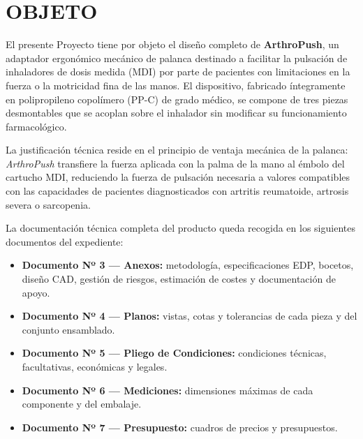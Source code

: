 \documentclass[11pt,a4paper]{article}
\begin{document}

\listoffigures

\newpage




\section{OBJETO}

El presente Proyecto tiene por objeto el diseño completo de \textbf{ArthroPush}, un adaptador ergonómico mecánico de palanca destinado a facilitar la pulsación de inhaladores de dosis medida (MDI) por parte de pacientes con limitaciones en la fuerza o la motricidad fina de las manos. El dispositivo, fabricado íntegramente en polipropileno copolímero (PP-C) de grado médico, se compone de tres piezas desmontables que se acoplan sobre el inhalador sin modificar su funcionamiento farmacológico.

La justificación técnica reside en el principio de ventaja mecánica de la palanca: \textit{ArthroPush} transfiere la fuerza aplicada con la palma de la mano al émbolo del cartucho MDI, reduciendo la fuerza de pulsación necesaria a valores compatibles con las capacidades de pacientes diagnosticados con artritis reumatoide, artrosis severa o sarcopenia.

La documentación técnica completa del producto queda recogida en los siguientes documentos del expediente:

\begin{itemize}
    \item \textbf{Documento Nº 3 — Anexos:} metodología, especificaciones EDP, bocetos, diseño CAD, gestión de riesgos, estimación de costes y documentación de apoyo.
    \item \textbf{Documento Nº 4 — Planos:} vistas, cotas y tolerancias de cada pieza y del conjunto ensamblado.
    \item \textbf{Documento Nº 5 — Pliego de Condiciones:} condiciones técnicas, facultativas, económicas y legales.
    \item \textbf{Documento Nº 6 — Mediciones:} dimensiones máximas de cada componente y del embalaje.
    \item \textbf{Documento Nº 7 — Presupuesto:} cuadros de precios y presupuestos.
\end{itemize}
\end{document}
